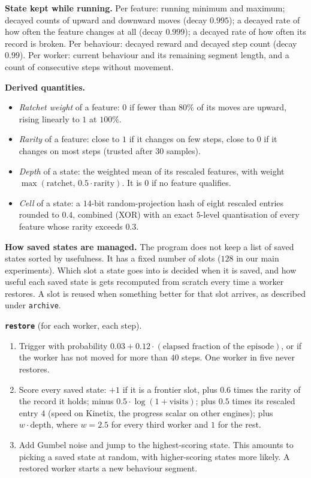 \documentclass{article}
\begin{document}
\textbf{State kept while running.} Per feature: running minimum and maximum; decayed counts of upward and downward moves
(decay $0.995$); a decayed rate of how often the feature changes at all (decay $0.999$); a decayed rate of how often its
record is broken. Per behaviour: decayed reward and decayed step count (decay $0.99$). Per worker: current behaviour and
its remaining segment length, and a count of consecutive steps without movement.

\textbf{Derived quantities.}
\begin{itemize}
\item \emph{Ratchet weight} of a feature: $0$ if fewer than $80\%$ of its moves are upward, rising linearly to $1$ at
$100\%$.
\item \emph{Rarity} of a feature: close to $1$ if it changes on few steps, close to $0$ if it changes on most steps
(trusted after $30$ samples).
\item \emph{Depth} of a state: the weighted mean of its rescaled features, with weight $\max(\text{ratchet},\,
0.5\cdot\text{rarity})$. It is $0$ if no feature qualifies.
\item \emph{Cell} of a state: a $14$-bit random-projection hash of eight rescaled entries rounded to $0.4$, combined (XOR)
with an exact $5$-level quantisation of every feature whose rarity exceeds $0.3$.
\end{itemize}

\textbf{How saved states are managed.} The program does not keep a list of saved states sorted by usefulness. It has a
fixed number of slots ($128$ in our main experiments). Which slot a state goes into is decided when it is saved, and how
useful each saved state is gets recomputed from scratch every time a worker restores. A slot is reused when something
better for that slot arrives, as described under \texttt{archive}.

\textbf{\texttt{restore}} (for each worker, each step).
\begin{enumerate}
\item Trigger with probability $0.03 + 0.12\cdot(\text{elapsed fraction of the episode})$, or if the worker has not moved
for more than $40$ steps. One worker in five never restores.
\item Score every saved state: $+1$ if it is a frontier slot, plus $0.6$ times the rarity of the record it holds; minus
$0.5\cdot\log(1+\text{visits})$; plus $0.5$ times its rescaled entry $4$ (speed on Kinetix, the progress scalar on other
engines); plus $w\cdot\text{depth}$, where $w=2.5$ for every
third worker and $1$ for the rest.
\item Add Gumbel noise and jump to the highest-scoring state. This amounts to picking a saved state at random, with
higher-scoring states more likely. A restored worker starts a new behaviour segment.
\end{enumerate}
\end{document}
